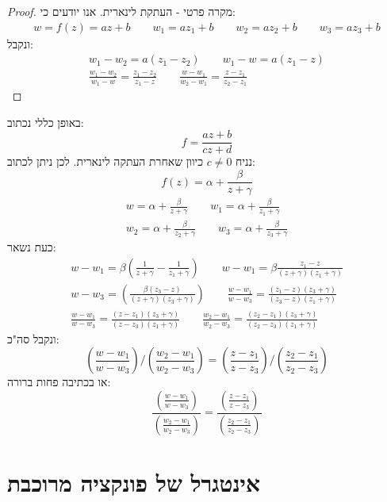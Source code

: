 \documentclass{tstextbook}
\begin{document}
\begin{proof}
מקרה פרטי - העתקת לינארית. אנו יודעים כי:
\begin{gather*}w = f(z)=az+b  \qquad w_{1}=az_{1}+b \qquad w_{2} = az_{2}+b \qquad w_{3}=az_{3}+b 
\end{gather*}
ונקבל:
\begin{gather*}w_{1}-w_{2} = a(z_{1}-z_{2}) \qquad w_{1}-w=a(z_{1}-z) \\\frac{w_{1}-w_{2}}{w_{1}-w}=\frac{z_{1}-z_{2}}{z_{1}-z} \qquad \frac{w-w_{1}}{w_{2}-w_{1}}=\frac{z-z_{1}}{z_{2}-z_{1}} 
\end{gather*}

\end{proof}
באופן כללי נכתוב:
$$f=\frac{az+b}{cz+d}$$
נניח \(c\neq 0\) כיוון שאחרת העתקה לינארית. לכן ניתן לכתוב:
$$f(z)=\alpha+\frac{\beta}{z+\gamma}$$\begin{gather*}w=\alpha+\frac{\beta}{z+\gamma} \qquad  w_{1}=\alpha+\frac{\beta}{z_{1}+\gamma}  \\w_{2}=\alpha+\frac{\beta}{z_{2}+\gamma} \qquad w_{3}=\alpha+\frac{\beta}{z_{3}+\gamma}
\end{gather*}
כעת נשאר:
\begin{gather*}w-w_{1}=\beta\left( \frac{1}{z+\gamma}-\frac{1}{z_{1}+\gamma} \right)  \qquad w-w_{1}=\beta \frac{z_{1}-z}{\left( z+\gamma \right)\left( z_{1}+\gamma \right)} \\w-w_{3} =\left( \frac{\beta (z_{3}-z)}{\left( z+\gamma \right)\left( z_{3}+\gamma \right)} \right) \qquad \frac{w-w_{1}}{w-w_{3}}=\frac{(z_{1}-z)\left( z_{3}+\gamma \right)}{(z_{3}-z)\left( z_{1}+\gamma \right)} \\\frac{w-w_{1}}{w-w_{3}} = \frac{(z-z_{1})\left( z_{3}+\gamma \right)}{(z-z_{3})\left( z_{1}+\gamma \right)} \qquad \frac{w_{2}-w_{1}}{w_{2}-w_{3}} = \frac{(z_{2}-z_{1})\left( z_{3}+\gamma \right)}{(z_{2}-z_{3})\left( z_{1}+\gamma \right)} 
\end{gather*}
ונקבל סה"כ:
$$\left( \frac{w-w_{1}}{w-w_{3}}  \right)/  \left( \frac{w_{2} - w_{1}}{w_{2}-w_{3}} \right) = \left( \frac{z - z_{1}}{z-z_{3}} \right) / \left( \frac{z_{2} - z_{1}}{z_{2}-z_{3}} \right)$$
או בכתיבה פחות ברורה:
$$\frac{\left( \frac{w-w_{1}}{w-w_{3}}  \right)}{\left( \frac{w_{2} - w_{1}}{w_{2}-w_{3}} \right)} = \frac{\left( \frac{z - z_{1}}{z-z_{3}} \right)}{\left( \frac{z_{2} - z_{1}}{z_{2}-z_{3}} \right)}$$


\section{אינטגרל של פונקציה מרוכבת}
\end{document}
